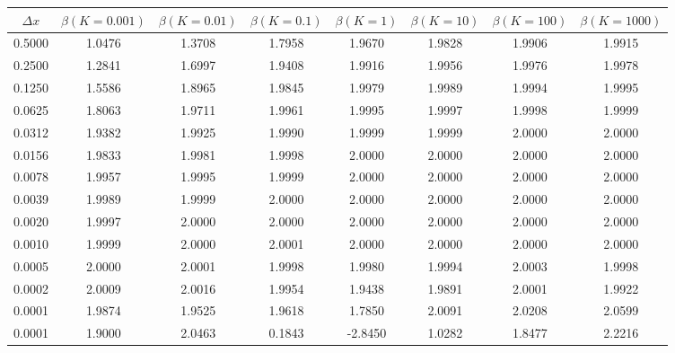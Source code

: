 \begin{tabular}{|c|c|c|c|c|c|c|c|}
\hline
\textbf{$\Delta x$}&\textbf{$\beta(K=0.001)$}&\textbf{$\beta(K=0.01)$}&\textbf{$\beta(K=0.1)$}&\textbf{$\beta(K=1)$}&\textbf{$\beta(K=10)$}&\textbf{$\beta(K=100)$}&\textbf{$\beta(K=1000)$}\\\hline
0.5000&1.0476&1.3708&1.7958&1.9670&1.9828&1.9906&1.9915\\\hline
0.2500&1.2841&1.6997&1.9408&1.9916&1.9956&1.9976&1.9978\\\hline
0.1250&1.5586&1.8965&1.9845&1.9979&1.9989&1.9994&1.9995\\\hline
0.0625&1.8063&1.9711&1.9961&1.9995&1.9997&1.9998&1.9999\\\hline
0.0312&1.9382&1.9925&1.9990&1.9999&1.9999&2.0000&2.0000\\\hline
0.0156&1.9833&1.9981&1.9998&2.0000&2.0000&2.0000&2.0000\\\hline
0.0078&1.9957&1.9995&1.9999&2.0000&2.0000&2.0000&2.0000\\\hline
0.0039&1.9989&1.9999&2.0000&2.0000&2.0000&2.0000&2.0000\\\hline
0.0020&1.9997&2.0000&2.0000&2.0000&2.0000&2.0000&2.0000\\\hline
0.0010&1.9999&2.0000&2.0001&2.0000&2.0000&2.0000&2.0000\\\hline
0.0005&2.0000&2.0001&1.9998&1.9980&1.9994&2.0003&1.9998\\\hline
0.0002&2.0009&2.0016&1.9954&1.9438&1.9891&2.0001&1.9922\\\hline
0.0001&1.9874&1.9525&1.9618&1.7850&2.0091&2.0208&2.0599\\\hline
0.0001&1.9000&2.0463&0.1843&-2.8450&1.0282&1.8477&2.2216\\\hline
\end{tabular}
